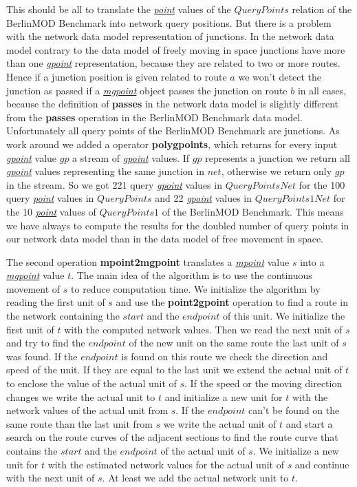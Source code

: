 \documentclass[a4paper]{article}
\newcommand{\bmodb} {BerlinMOD Benchmark}
\newcommand{\op}[1]{\textbf{#1}}
\newcommand{\dt}[1]{\textsl{\underline{#1}}}
\begin{document}
{This should be all to translate the \dt{point} values of the $QueryPoints$
relation of the \bmodb{} into network query positions. But there is a problem with
the network data model representation of junctions. In the network data model
contrary to the data model of freely moving in space junctions have more than one
\dt{gpoint} representation, because they are related to two or more routes. Hence
if a junction position is given related to route $a$ we won't detect the
junction as passed if a \dt{mgpoint} object passes the junction on route $b$
in all cases, because the definition of \op{passes} in the network data model is
slightly different from the \op{passes} operation in the \bmodb{} data model.
Unfortunately all query points of the \bmodb{} are junctions. As work around we
added a operator \op{polygpoints}, which returns for every input \dt{gpoint}
value $gp$ a stream of \dt{gpoint} values. If $gp$ represents a junction
we return all \dt{gpoint} values representing the same junction in $net$,
otherwise we return only $gp$ in the stream. So we got 221 query \dt{gpoint}
values in $QueryPointsNet$ for the 100 query \dt{point} values in
$QueryPoints$ and 22 \dt{gpoint} values in $QueryPoints1Net$ for the
10 \dt{point} values of $QueryPoints1$ of the \bmodb{}. This means we have
always to compute the results for the doubled number of query points in our network
data model than in the data model of free movement in space.

The second operation \op{mpoint2mgpoint} translates a \dt{mpoint} value $s$
into a \dt{mgpoint} value $t$. The main idea of the algorithm is to use the
continuous movement of $s$ to reduce computation time. We initialize the
algorithm by reading the first unit of $s$ and use the \op{point2gpoint}
operation to find a route in the network containing the $start$ and
the $end point$ of this unit. We initialize the first unit of $t$ with
the computed network values. Then we read the next unit of $s$ and try to find
the $end point$ of the new unit on the same route the last unit of $s$ was
found. If the $end point$ is found on this route we check the direction and
speed of the unit. If they are equal to the last unit we extend the actual unit
of $t$ to enclose the value of the actual unit of $s$. If the speed or
the moving direction changes we write the actual unit to $t$ and initialize
a new unit for $t$ with the network values of the actual unit from $s$.
If the $end point$ can't be found on the same route than the last unit from
$s$ we write the actual unit of $t$ and start a search on the route curves
of the adjacent sections to find the route curve that contains the $start$
and the $end point$ of the actual unit of $s$. We initialize a new unit
for $t$ with the estimated network values for the actual unit of $s$ and
continue with the next unit of $s$. At least we add the actual network unit
to $t$.

}
\end{document}
